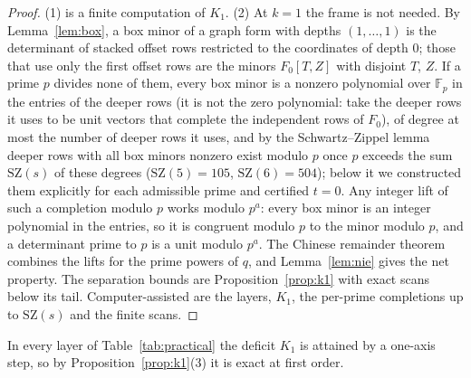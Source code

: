 \documentclass[11pt]{amsart}
\theoremstyle{definition}
\theoremstyle{plain}
\newcommand{\F}{\mathbb{F}}
\begin{document}
\begin{proof}
(1) is a finite computation of $K_1$. (2) At $k=1$ the frame is not needed. By Lemma~\ref{lem:box}, a box minor of a graph form with depths $(1,\dots,1)$ is the determinant of stacked offset rows restricted to the coordinates of depth $0$; those that use only the first offset rows are the minors $F_0[T,Z]$ with disjoint $T$, $Z$. If a prime $p$ divides none of them, every box minor is a nonzero polynomial over $\F_p$ in the entries of the deeper rows (it is not the zero polynomial: take the deeper rows it uses to be unit vectors that complete the independent rows of $F_0$), of degree at most the number of deeper rows it uses, and by the Schwartz--Zippel lemma deeper rows with all box minors nonzero exist modulo $p$ once $p$ exceeds the sum $\mathrm{SZ}(s)$ of these degrees ($\mathrm{SZ}(5)=105$, $\mathrm{SZ}(6)=504$); below it we constructed them explicitly for each admissible prime and certified $t=0$. Any integer lift of such a completion modulo $p$ works modulo $p^a$: every box minor is an integer polynomial in the entries, so it is congruent modulo $p$ to the minor modulo $p$, and a determinant prime to $p$ is a unit modulo $p^a$. The Chinese remainder theorem combines the lifts for the prime powers of $q$, and Lemma~\ref{lem:nie} gives the net property. The separation bounds are Proposition~\ref{prop:k1} with exact scans below its tail. Computer-assisted are the layers, $K_1$, the per-prime completions up to $\mathrm{SZ}(s)$ and the finite scans.
\end{proof}

In every layer of Table~\ref{tab:practical} the deficit $K_1$ is attained by a one-axis step, so by Proposition~\ref{prop:k1}(3) it is exact at first order.
\end{document}
